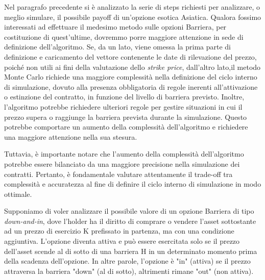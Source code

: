 \documentclass[12pt,a4paper]{report}
\begin{document}
Nel paragrafo precedente si è analizzato la serie di steps richiesti per analizzare, o meglio simulare, il possibile payoff di un'opzione esotica Asiatica. Qualora fossimo interessati ad effettuare il medesimo metodo sulle opzioni Barriera, per costituzione di quest'ultime, dovremmo porre maggiore attenzione in sede di definizione dell'algoritmo. Se, da un lato, viene omessa la prima parte di definizione e caricamento del vettore contenente le date di rilevazione del prezzo, poiché non utili ai fini della valutazione dello \textit{strike price}, dall'altro lato,il metodo Monte Carlo richiede una maggiore complessità nella definizione del ciclo interno di simulazione, dovuto alla presenza obbligatoria di regole inerenti all'attivazione o estinzione del contratto, in funzione del livello di barriera previsto. Inoltre, l'algoritmo potrebbe richiedere ulteriori regole per gestire situazioni in cui il prezzo supera o raggiunge la barriera prevista durante la simulazione. Questo potrebbe comportare un aumento della complessità dell'algoritmo e richiedere una maggiore attenzione nella sua stesura.

Tuttavia, è importante notare che l'aumento della complessità dell'algoritmo potrebbe essere bilanciato da una maggiore precisione nella simulazione dei contratti. Pertanto, è fondamentale valutare attentamente il trade-off tra complessità e accuratezza al fine di definire il ciclo interno di simulazione in modo ottimale. 


Supponiamo di voler analizzare il possibile valore di un opzione Barriera di tipo \textit{down-and-in}, dove l'holder ha il diritto di comprare o vendere l'asset sottostante ad un prezzo di esercizio K prefissato in partenza, ma con una condizione aggiuntiva. L'opzione diventa attiva e può essere esercitata solo se il prezzo dell'asset  scende al di sotto di una barriera H in un determinato momento prima della scadenza dell'opzione. In altre parole, l'opzione è "in" (attiva) se il prezzo attraversa la barriera "down" (al di sotto), altrimenti rimane "out" (non attiva).
\end{document}
